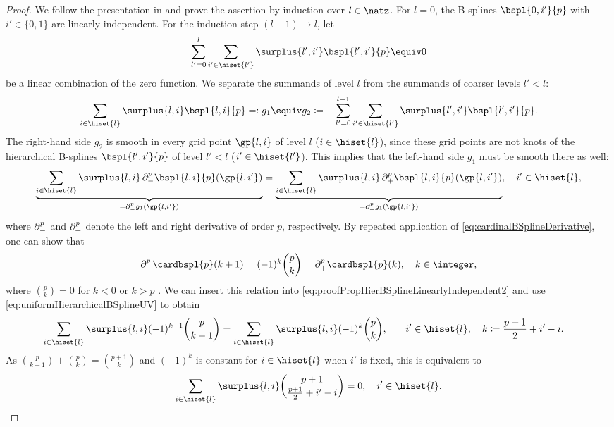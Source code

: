 \begin{proof}
  We follow the presentation in \cite{Valentin16Hierarchical} and
  prove the assertion by induction over $l \in \natz$.
  For $l = 0$, the B-splines $\bspl{0,i'}{p}$ with $i' \in \{0, 1\}$
  are linearly independent.
  For the induction step $(l-1) \to l$, let
  \begin{equation}
    \label{eq:proofPropHierBSplineLinearlyIndependent1}
    \sum_{l'=0}^l \sum_{i' \in \hiset{l'}} \surplus{l',i'} \bspl{l',i'}{p}
    \equiv 0
  \end{equation}
  be a linear combination of the zero function.
  We separate the summands of level $l$
  from the summands of coarser levels $l' < l$:
  \begin{equation}
    \sum_{i \in \hiset{l}} \surplus{l,i} \bspl{l,i}{p}
    =: g_1 \equiv g_2 \ceq
    -\sum_{l'=0}^{l-1} \sum_{i' \in \hiset{l'}} \surplus{l',i'} \bspl{l',i'}{p}.
  \end{equation}
  The right-hand side $g_2$ is smooth in every grid point
  $\gp{l,i}$ of level $l$ ($i \in \hiset{l}$),
  since these grid points are not knots of the hierarchical B-splines
  $\bspl{l',i'}{p}$ of level $l' < l$ ($i' \in \hiset{l'}$).
  This implies that the left-hand side $g_1$ must be smooth there as well:
  \begin{equation}
    \label{eq:proofPropHierBSplineLinearlyIndependent2}
    \underbrace{
      \sum_{i \in \hiset{l}} \surplus{l,i}
      \partialdiff_-^p \bspl{l,i}{p}(\gp{l,i'})
    }_{{} = \partialdiff_-^p g_1(\gp{l,i'})}
    =
    \underbrace{
      \sum_{i \in \hiset{l}} \surplus{l,i}
      \partialdiff_+^p \bspl{l,i}{p}(\gp{l,i'})
    }_{{} = \partialdiff_+^p g_1(\gp{l,i'})},\quad
    i' \in \hiset{l},
  \end{equation}
  where $\mathop{}\!\partial_-^p$ and $\mathop{}\!\partial_+^p$ denote the left and right
  derivative of order $p$, respectively.
  By repeated application of \eqref{eq:cardinalBSplineDerivative},
  one can show that
  \begin{equation}
    \partialdiff_-^p \cardbspl{p}(k + 1)
    = (-1)^k \binom{p}{k}
    = \partialdiff_+^p \cardbspl{p}(k),\quad
    k \in \integer,
  \end{equation}
  where $\binom{p}{k} = 0$ for $k < 0$ or $k > p$
  \cite{Hoellig13Approximation}.
  We can insert this relation into
  \eqref{eq:proofPropHierBSplineLinearlyIndependent2}
  and use \eqref{eq:uniformHierarchicalBSplineUV} to obtain
  \begin{alignat}{2}
    \sum_{i \in \hiset{l}} \surplus{l,i} (-1)^{k-1} \binom{p}{k-1}
    &= \sum_{i \in \hiset{l}} \surplus{l,i} (-1)^k \binom{p}{k},\quad
    &&i' \in \hiset{l},\quad
    k \ceq \frac{p+1}{2} + i' - i.
  \end{alignat}
  As $\binom{p}{k-1} + \binom{p}{k} = \binom{p+1}{k}$
  and $(-1)^k$ is constant for $i \in \hiset{l}$ when $i'$ is fixed,
  this is equivalent to
  \begin{equation}
    \label{eq:proofPropHierBSplineLinearlyIndependent3}
    \sum_{i \in \hiset{l}} \surplus{l,i}
    \binom{p+1}{\frac{p+1}{2} + i' - i} = 0,\quad
    i' \in \hiset{l}.
  \end{equation}
  

\end{proof}
